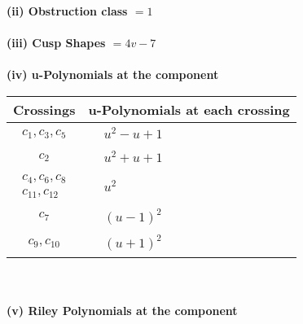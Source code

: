 \documentclass[1p]{elsarticle_modified}
\theoremstyle{definition}
\begin{document}
\flushleft \textbf{(ii) Obstruction class $= 1$}\\~\\
\flushleft \textbf{(iii) Cusp Shapes $= 4 v-7$}\\~\\
\newpage\renewcommand{\arraystretch}{1}
\flushleft \textbf{(iv) u-Polynomials at the component}\newline \\
\begin{tabular}{m{50pt}|m{274pt}}
Crossings & \hspace{64pt}u-Polynomials at each crossing \\
\hline $$\begin{aligned}c_{1},c_{3},c_{5}\end{aligned}$$&$\begin{aligned}
&u^2- u+1
\end{aligned}$\\
\hline $$\begin{aligned}c_{2}\end{aligned}$$&$\begin{aligned}
&u^2+u+1
\end{aligned}$\\
\hline $$\begin{aligned}c_{4},c_{6},c_{8}\\c_{11},c_{12}\end{aligned}$$&$\begin{aligned}
&u^2
\end{aligned}$\\
\hline $$\begin{aligned}c_{7}\end{aligned}$$&$\begin{aligned}
&(u-1)^2
\end{aligned}$\\
\hline $$\begin{aligned}c_{9},c_{10}\end{aligned}$$&$\begin{aligned}
&(u+1)^2
\end{aligned}$\\
\hline
\end{tabular}\\~\\
\newpage\renewcommand{\arraystretch}{1}
\flushleft \textbf{(v) Riley Polynomials at the component}\newline \\
\end{document}
